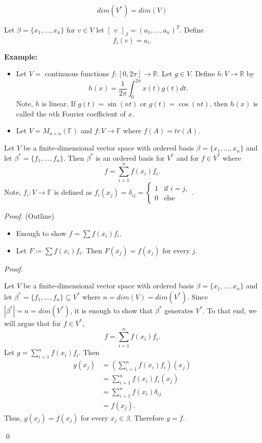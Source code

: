 \documentclass[12pt]{article}
\newenvironment{theorem}[2][Theorem]{\begin{trivlist}
\item[\hskip \labelsep {\bfseries #1}\hskip \labelsep {\bfseries #2.}]}{\end{trivlist}}
\newenvironment{sol}
    {\emph{Proof.}
    }
    {
    \qed
    }
\begin{document}
$$dim(V^*) = dim(V)$$

\noindent Let $\beta = \{x_1, \dots, x_n\}$ for $v \in V$ let $\begin{bmatrix} v \end{bmatrix}_\beta = (a_1, \dots, a_n)^T$. Define $$f_i(v) = a_i.$$

\noindent\textbf{Example:} 
\begin{itemize}
    \item[(1)] Let $V =$ continuous functions $f:[0, 2\pi] \to \mathbb{R}$. Let $g \in V$. Define $h : V \to \mathbb{R}$ by $$h(x) = \frac{1}{2\pi}\int_0^{2\pi}x(t)g(t)dt.$$ Note, $h$ is linear. If $g(t) = \sin(nt)$ or $g(t) = \cos(nt)$, then $h(x)$ is called the $n$th Fourier coefficient of $x$.
    
    \item[(2)] Let $V = M_{n \times n}(\mathbb{F})$ and $f : V \to \mathbb{F}$ where $f(A) = tr(A)$.
\end{itemize}

\begin{theorem}{2.24}
Let $V$ be a finite-dimensional vector space with ordered basis $\beta = \{x_1, \dots, x_n\}$ and let $\beta^* = \{f_1, \dots, f_n\}$. Then $\beta^*$ is an ordered basis for $V^*$ and for $f \in V^*$ where $$f = \sum_{i = 1}^n f(x_i)f_i.$$ Note, $f_i : V \to \mathbb{F}$ is defined as $f_i(x_j) = \delta_{ij} = \begin{cases} 
            1 &\text{if } i=j, \\
            0 &\text{else}
        \end{cases}.$
\end{theorem}

\textit{Proof.} (Outline)
\begin{itemize}
    \item Enough to show $f = \sum f(x_i)f_i$.
    
    \item Let $F \coloneqq \sum f(x_i)f_i$. Then $F(x_j) = f(x_j)$ for every $j$.
\end{itemize}

\begin{sol}
Let $V$ be a finite-dimensional vector space with ordered basis $\beta = \{x_1, \dots, x_n\}$ and let $\beta^* = \{f_1, \dots, f_n\} \subseteq V^*$ where $n = dim(V) = dim(V^*)$. Since $| \beta^*| = n = dim(V^*)$, it is enough to show that $\beta^*$ generates $V^*$. To that end, we will argue that for $f \in V^*$, $$f = \sum_{i = 1}^n f(x_i)f_i.$$ Let $g = \sum_{i = 1}^n f(x_i)f_i$. Then
\begin{align*}
    g(x_j) &= \left( \sum_{i = 1}^n f(x_i)f_i \right)(x_j) \\
    &= \sum_{i = 1}^nf(x_i)f_i(x_j) \\
    &= \sum_{i = 1}^n f(x_i)\delta_{ij} \\
    &= f(x_j).
\end{align*} Thus, $g(x_j) = f(x_j)$ for every $x_j \in \beta$. Therefore $g = f$. 
\end{sol}
\end{document}
